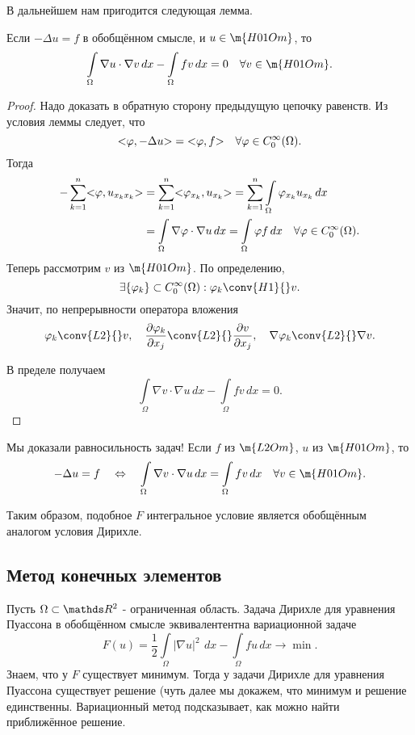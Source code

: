 В дальнейшем нам пригодится следующая лемма.
\begin{lemma}
Если $-\Delta u = f$ в обобщённом смысле, и $u \in \m{H01Om}$, то
$$ \int \limits_\Omega \nabla u \cdot \nabla v \, dx - \int \limits_\Omega fv \, dx = 0 \quad \forall v \in \m{H01Om}.$$
\end{lemma}
\begin{proof} Надо доказать в обратную сторону предыдущую цепочку равенств. Из условия леммы следует, что 
$$ \action{\varphi, -\Delta u} = \action{\varphi, f} \quad \forall \varphi \in C_0^\infty(\Omega).$$
Тогда 
\begin{align*}
- \sum_{k=1}^n \action{\varphi, u_{x_k x_k}} &= \sum_{k=1}^n \action{\varphi_{x_k}, u_{x_k}} = \sum_{k=1}^n \int \limits_\Omega \varphi_{x_k} u_{x_k} \, dx \\
&= \int \limits_\Omega \nabla \varphi \cdot \nabla u \, dx = \int \limits_\Omega \varphi f \, dx \quad \forall \varphi \in C_0^\infty(\Omega).
\end{align*}
Теперь рассмотрим $v$ из $\m{H01Om}$. По определению,
$$ \exists \{ \varphi_k \} \subset C_0^\infty(\Omega) : \varphi_k \conv{H1}{} v.$$
Значит, по непрерывности оператора вложения
$$ \varphi_k \conv{L2}{} v, \quad \pder[\varphi_k]{x_j} \conv{L2}{} \pder[v]{x_j}, \quad \nabla \varphi_k \conv{L2}{} \nabla v.$$

В пределе получаем
$$ \int \limits_\Omega \nabla v \cdot \nabla u \, dx - \int \limits_\Omega fv \, dx = 0.$$

\end{proof}

\begin{note} Мы доказали равносильность задач! Если $f$ из $\m{L2Om}$, $u$ из $\m{H01Om}$, то
$$ -\Delta u = f \quad \Leftrightarrow \quad \int \limits_\Omega \nabla v \cdot \nabla u \, dx = \int \limits_\Omega fv \, dx \quad \forall v \in \m{H01Om}.$$
\end{note}

Таким образом, подобное $F$ интегральное условие является обобщённым аналогом условия Дирихле.


\subsection{Метод конечных элементов} Пусть $\Omega \subset \real^2$ - ограниченная область. Задача Дирихле для уравнения Пуассона в обобщённом смысле эквивалентентна вариационной задаче
$$ F(u) = \frac {1}{2} \int \limits_\Omega |\nabla u|^2\ \,dx - \int \limits_\Omega fu \, dx \rightarrow \min.$$
Знаем, что у $F$ существует минимум. Тогда у задачи Дирихле для уравнения Пуассона существует решение (чуть далее мы докажем, что минимум и решение единственны. Вариационный метод подсказывает, как можно найти приближённое решение.

